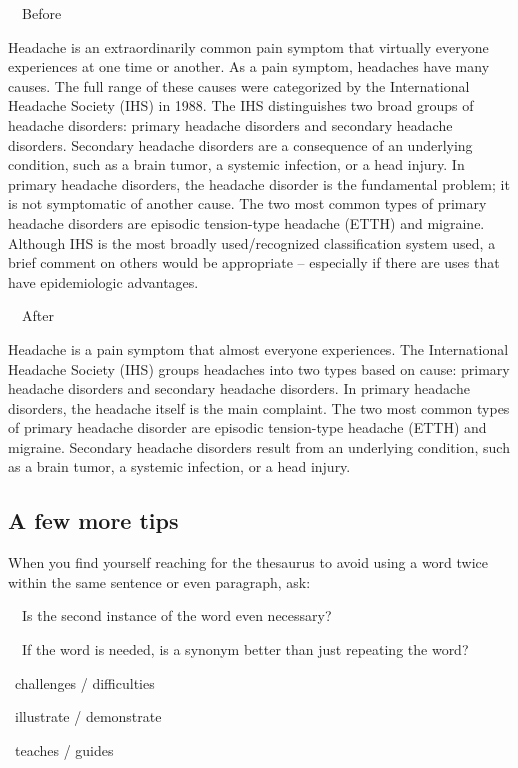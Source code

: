 \documentclass[a4paper, 12pt]{article}
\begin{document}
\newpage\par\ \textbullet\ Before
\par Headache is an extraordinarily common pain symptom that virtually everyone experiences at one time or another. As a pain symptom, headaches have many causes. The full range of these causes were categorized by the International Headache Society (IHS) in 1988. The IHS distinguishes two broad groups of headache disorders: primary headache disorders and secondary headache disorders. Secondary headache disorders are a consequence of an underlying condition, such as a brain tumor, a systemic infection, or a head injury. In primary headache disorders, the headache disorder is the fundamental problem; it is not symptomatic of another cause. The two most common types of primary headache disorders are episodic tension-type headache (ETTH) and migraine. Although IHS is the most broadly used/recognized classification system used, a brief comment on others would be appropriate – especially if there are uses that have epidemiologic advantages.

\par\ \textbullet\ After
\par Headache is a pain symptom that almost everyone experiences. The International Headache Society (IHS) groups headaches into two types based on cause: primary headache disorders and secondary headache disorders. In primary headache disorders, the headache itself is the main complaint. The two most common types of primary headache disorder are episodic tension-type headache (ETTH) and migraine. Secondary headache disorders result from an underlying condition, such as a brain tumor, a systemic infection, or a head injury.

\newpage\subsection{A few more tips}

When you find yourself reaching for the thesaurus to avoid using a word twice within the same sentence or even paragraph, ask:
\par\ \textbullet\ Is the second instance of the word even necessary?
\par\ \textbullet\ If the word is needed, is a synonym better than just repeating the word?
\par\quad\textopenbullet\ challenges / difficulties
\par\quad\textopenbullet\ illustrate / demonstrate
\par\quad\textopenbullet\ teaches / guides
\end{document}
